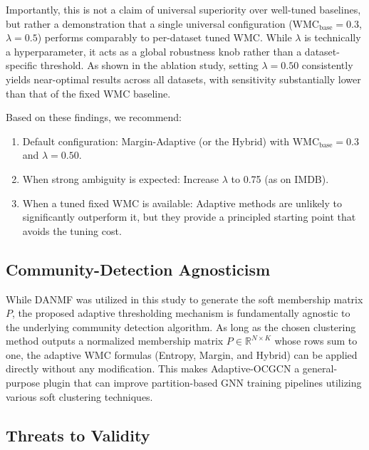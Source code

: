 \documentclass[pdflatex,sn-mathphys-num]{sn-jnl}%
\theoremstyle{thmstyleone}%
\theoremstyle{thmstyletwo}%
\theoremstyle{thmstylethree}%
\begin{document}
Importantly, this is not a claim of universal superiority over well-tuned baselines, but rather a demonstration that a single universal configuration ($\mathrm{WMC}_{\mathrm{base}}=0.3$, $\lambda=0.5$) performs comparably to per-dataset tuned WMC. 
While $\lambda$ is technically a hyperparameter, it acts as a global robustness knob rather than a dataset-specific threshold. 
As shown in the ablation study, setting $\lambda=0.50$ consistently yields near-optimal results across all datasets, with sensitivity substantially lower than that of the fixed WMC baseline.

Based on these findings, we recommend:

\begin{enumerate}
  \item {Default configuration}: Margin-Adaptive (or the Hybrid) with $\mathrm{WMC}_{\mathrm{base}}=0.3$ and $\lambda=0.50$. 
  \item {When strong ambiguity is expected}: Increase $\lambda$ to 0.75 (as on IMDB). 
  \item {When a tuned fixed WMC is available}: Adaptive methods are unlikely to significantly outperform it, but they provide a principled starting point that avoids the tuning cost.
\end{enumerate}

\subsection{Community-Detection Agnosticism}
\label{subsec:agnosticism}

While DANMF was utilized in this study to generate the soft membership matrix $P$, the proposed adaptive thresholding mechanism is fundamentally agnostic to the underlying community detection algorithm. 
As long as the chosen clustering method outputs a normalized membership matrix $P \in \mathbb{R}^{N \times K}$ whose rows sum to one, the adaptive WMC formulas (Entropy, Margin, and Hybrid) can be applied directly without any modification. 
This makes Adaptive-OCGCN a general-purpose plugin that can improve partition-based GNN training pipelines utilizing various soft clustering techniques.

\subsection{Threats to Validity}
\label{sec:threats}
\end{document}
